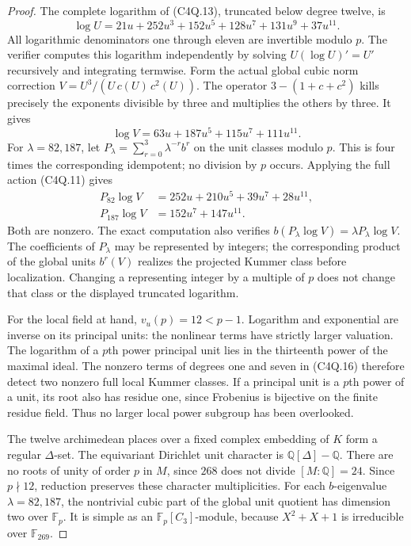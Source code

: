 \begin{proof}
The complete logarithm of (C4Q.13), truncated below degree twelve, is
\[
 \log U=21u+252u^3+152u^5+128u^7+131u^9+37u^{11}.
 \tag{C4Q.14}
\]
All logarithmic denominators one through eleven are invertible
modulo $p$.  The verifier computes this logarithm independently
by solving $U(\log U)'=U'$ recursively and integrating termwise.
Form the actual global cubic norm correction
$V=U^3/(U\,c(U)\,c^2(U))$.
The operator $3-(1+c+c^2)$ kills precisely the exponents divisible
by three and multiplies the others by three.  It gives
\[
              \log V=63u+187u^5+115u^7+111u^{11}.
 \tag{C4Q.15}
\]
For $\lambda=82,187$, let
$P_\lambda=\sum_{r=0}^3\lambda^{-r}b^r$ on the unit classes
modulo $p$.
This is four times the corresponding idempotent; no division
by $p$ occurs.  Applying the full action (C4Q.11) gives
\[
 \begin{aligned}
 P_{82}\log V&=252u+210u^5+39u^7+28u^{11},\\
 P_{187}\log V&=152u^7+147u^{11}.
 \end{aligned}
 \tag{C4Q.16}
\]
Both are nonzero.  The exact computation also verifies
$b(P_\lambda\log V)=\lambda P_\lambda\log V$.
The coefficients of $P_\lambda$ may be represented by integers;
the corresponding product of the global units $b^r(V)$ realizes
the projected Kummer class before localization.
Changing a representing integer by a multiple of $p$ does not
change that class or the displayed truncated logarithm.

For the local field at hand, $v_u(p)=12<p-1$.
Logarithm and exponential are inverse on its principal units:
the nonlinear terms have strictly larger valuation.
The logarithm of a $p$th power principal unit lies in the thirteenth
power of the maximal ideal.  The nonzero terms of degrees one
and seven in (C4Q.16) therefore detect two nonzero full local
Kummer classes.  If a principal unit is a $p$th power of a unit,
its root also has residue one, since Frobenius is bijective on
the finite residue field.  Thus no larger local power subgroup
has been overlooked.

The twelve archimedean places over a fixed complex embedding of
$K$ form a regular $\Delta$-set.
The equivariant Dirichlet unit character is
$\mathbb Q[\Delta]-\mathbb Q$.
There are no roots of unity of order $p$ in $M$, since
$268$ does not divide $[M:\mathbb Q]=24$.
Since $p\nmid12$, reduction preserves these character multiplicities.
For each $b$-eigenvalue $\lambda=82,187$, the nontrivial cubic
part of the global unit quotient has dimension two over
$\mathbb F_p$.
It is simple as an $\mathbb F_p[C_3]$-module, because
$X^2+X+1$ is irreducible over $\mathbb F_{269}$.


\end{proof}
